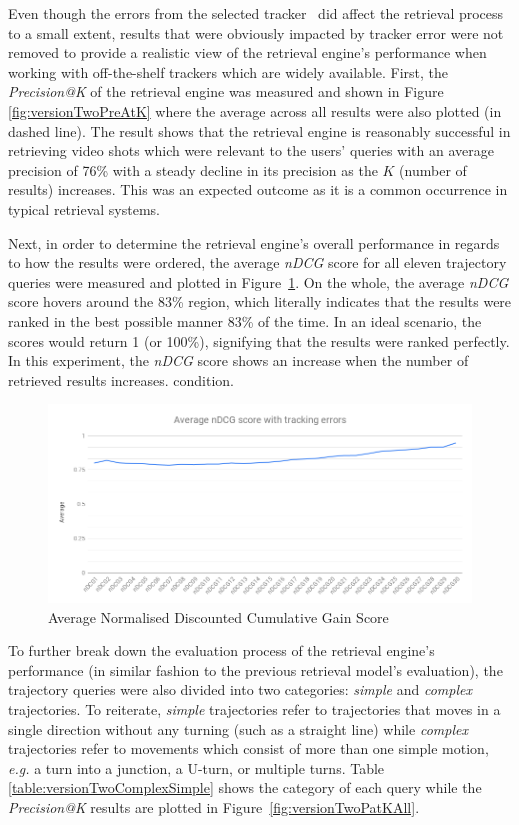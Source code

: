 Even though the errors from the selected tracker~\cite{lim2017} did affect the retrieval process to a small extent, results that were obviously impacted by tracker error were not removed to provide a realistic view of the retrieval engine's performance when working with off-the-shelf trackers which are widely available. First, the \textit{Precision@K} of the retrieval engine was measured and shown in Figure \ref{fig:versionTwoPreAtK} where the average across all results were also plotted (in dashed line). The result shows that the retrieval engine is reasonably successful in retrieving video shots which were relevant to the users' queries with an average precision of 76\% with a steady decline in its precision as the $K$ (number of results) increases. This was an expected outcome as it is a common occurrence in typical retrieval systems.

Next, in order to determine the retrieval engine's overall performance in regards to how the results were ordered, the average \textit{nDCG} score for all eleven trajectory queries were measured and plotted in Figure~\ref{fig:ndcgWithError}. On the whole, the average \textit{nDCG} score hovers around the 83\% region, which literally indicates that the results were ranked in the best possible manner 83\% of the time. In an ideal scenario, the scores would return 1 (or 100\%), signifying that the results were ranked perfectly. In this experiment, the \textit{nDCG} score shows an increase when the number of retrieved results increases. %
condition.
\begin{figure}[!tb]
  \centering
    \includegraphics[width=0.9\linewidth]{image/retrievalTwo/averageNDCG.png}
  \caption{Average Normalised Discounted Cumulative Gain Score}
  \label{fig:ndcgWithError}
\end{figure}

To further break down the evaluation process of the retrieval engine's performance (in similar fashion to the previous retrieval model's evaluation), the trajectory queries were also divided into two categories: \textit{simple} and \textit{complex} trajectories. To reiterate, \textit{simple} trajectories refer to trajectories that moves in a single direction without any turning (such as a straight line) while \textit{complex} trajectories refer to movements which consist of more than one simple motion, \emph{e.g.} a turn into a junction, a U-turn, or multiple turns. Table \ref{table:versionTwoComplexSimple} shows the category of each query while the \textit{Precision@K} results are plotted in Figure~\ref{fig:versionTwoPatKAll}.

